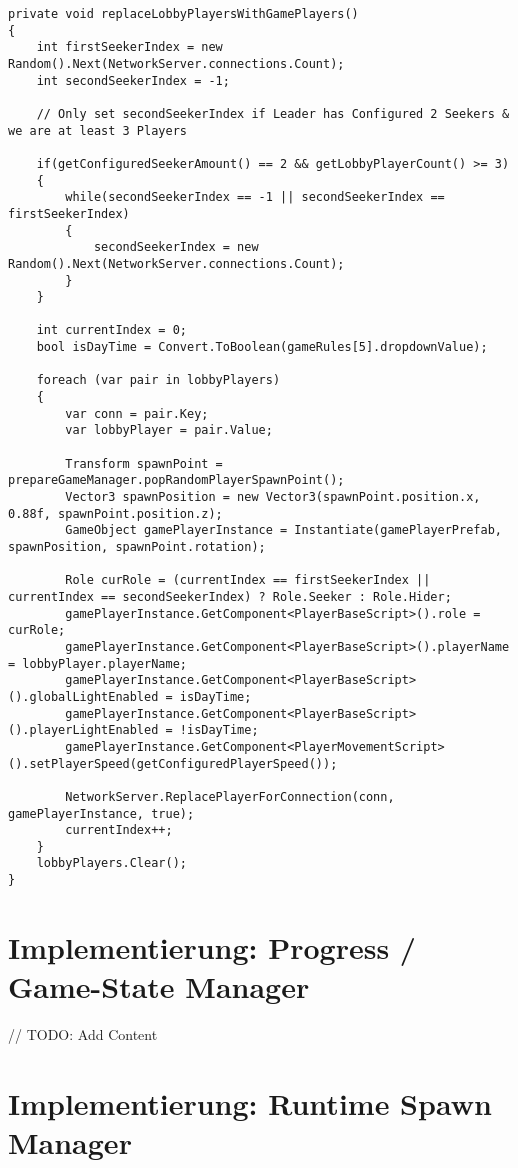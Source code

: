 \begin{lstlisting}[caption= GameNetworkManager.cs replaceLobbyPlayersWithGamePlayers()]
private void replaceLobbyPlayersWithGamePlayers()
{
	int firstSeekerIndex = new Random().Next(NetworkServer.connections.Count);
	int secondSeekerIndex = -1;
	
	// Only set secondSeekerIndex if Leader has Configured 2 Seekers & we are at least 3 Players
	
	if(getConfiguredSeekerAmount() == 2 && getLobbyPlayerCount() >= 3)
	{
		while(secondSeekerIndex == -1 || secondSeekerIndex == firstSeekerIndex)
		{
			secondSeekerIndex = new Random().Next(NetworkServer.connections.Count);
		}
	}
	
	int currentIndex = 0;
	bool isDayTime = Convert.ToBoolean(gameRules[5].dropdownValue);
	
	foreach (var pair in lobbyPlayers)
	{
		var conn = pair.Key;
		var lobbyPlayer = pair.Value;
		
		Transform spawnPoint = prepareGameManager.popRandomPlayerSpawnPoint();
		Vector3 spawnPosition = new Vector3(spawnPoint.position.x, 0.88f, spawnPoint.position.z);
		GameObject gamePlayerInstance = Instantiate(gamePlayerPrefab, spawnPosition, spawnPoint.rotation);
		
		Role curRole = (currentIndex == firstSeekerIndex || currentIndex == secondSeekerIndex) ? Role.Seeker : Role.Hider;
		gamePlayerInstance.GetComponent<PlayerBaseScript>().role = curRole;
		gamePlayerInstance.GetComponent<PlayerBaseScript>().playerName = lobbyPlayer.playerName;
		gamePlayerInstance.GetComponent<PlayerBaseScript>().globalLightEnabled = isDayTime;
		gamePlayerInstance.GetComponent<PlayerBaseScript>().playerLightEnabled = !isDayTime;
		gamePlayerInstance.GetComponent<PlayerMovementScript>().setPlayerSpeed(getConfiguredPlayerSpeed());
		
		NetworkServer.ReplacePlayerForConnection(conn, gamePlayerInstance, true);
		currentIndex++;
	}
	lobbyPlayers.Clear();
}
\end{lstlisting}


\section{Implementierung: Progress / Game-State Manager}
\label{Progress Manager}

// TODO: Add Content

\section{Implementierung: Runtime Spawn Manager}

